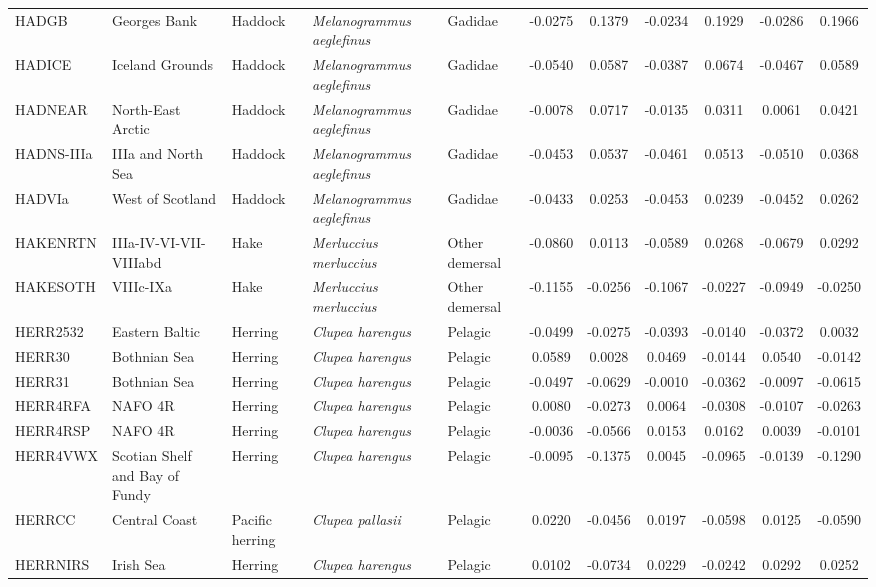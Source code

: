\begin{longtable}{p{3cm}p{3cm}lllcccccc}
  HADGB & Georges Bank & Haddock & \textit{Melanogrammus aeglefinus} & Gadidae & -0.0275 & 0.1379 & -0.0234 & 0.1929 & -0.0286 & 0.1966 \\
  HADICE & Iceland Grounds & Haddock & \textit{Melanogrammus aeglefinus} & Gadidae & -0.0540 & 0.0587 & -0.0387 & 0.0674 & -0.0467 & 0.0589 \\
  HADNEAR & North-East Arctic & Haddock & \textit{Melanogrammus aeglefinus} & Gadidae & -0.0078 & 0.0717 & -0.0135 & 0.0311 & 0.0061 & 0.0421 \\
  HADNS-IIIa & IIIa and North Sea & Haddock & \textit{Melanogrammus aeglefinus} & Gadidae & -0.0453 & 0.0537 & -0.0461 & 0.0513 & -0.0510 & 0.0368 \\
  HADVIa & West of Scotland & Haddock & \textit{Melanogrammus aeglefinus} & Gadidae & -0.0433 & 0.0253 & -0.0453 & 0.0239 & -0.0452 & 0.0262 \\
  HAKENRTN & IIIa-IV-VI-VII-VIIIabd & Hake & \textit{Merluccius merluccius} & Other demersal & -0.0860 & 0.0113 & -0.0589 & 0.0268 & -0.0679 & 0.0292 \\
  HAKESOTH & VIIIc-IXa & Hake & \textit{Merluccius merluccius} & Other demersal & -0.1155 & -0.0256 & -0.1067 & -0.0227 & -0.0949 & -0.0250 \\
  HERR2532 & Eastern Baltic & Herring & \textit{Clupea harengus} & Pelagic & -0.0499 & -0.0275 & -0.0393 & -0.0140 & -0.0372 & 0.0032 \\
  HERR30 & Bothnian Sea & Herring & \textit{Clupea harengus} & Pelagic & 0.0589 & 0.0028 & 0.0469 & -0.0144 & 0.0540 & -0.0142 \\
  HERR31 & Bothnian Sea & Herring & \textit{Clupea harengus} & Pelagic & -0.0497 & -0.0629 & -0.0010 & -0.0362 & -0.0097 & -0.0615 \\
  HERR4RFA & NAFO 4R & Herring & \textit{Clupea harengus} & Pelagic & 0.0080 & -0.0273 & 0.0064 & -0.0308 & -0.0107 & -0.0263 \\
  HERR4RSP & NAFO 4R & Herring & \textit{Clupea harengus} & Pelagic & -0.0036 & -0.0566 & 0.0153 & 0.0162 & 0.0039 & -0.0101 \\
  HERR4VWX & Scotian Shelf and Bay of Fundy & Herring & \textit{Clupea harengus} & Pelagic & -0.0095 & -0.1375 & 0.0045 & -0.0965 & -0.0139 & -0.1290 \\
  HERRCC & Central Coast & Pacific herring & \textit{Clupea pallasii} & Pelagic & 0.0220 & -0.0456 & 0.0197 & -0.0598 & 0.0125 & -0.0590 \\
  HERRNIRS & Irish Sea & Herring & \textit{Clupea harengus} & Pelagic & 0.0102 & -0.0734 & 0.0229 & -0.0242 & 0.0292 & 0.0252 \\

\end{longtable}
